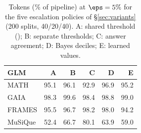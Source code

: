 \begin{table}[h]
\centering
\small
\begin{tabular}{@{}lrrrrr@{}}
\toprule
GLM & A & B & C & D & E \\
\midrule
MATH & 95.1 & 96.1 & 92.9 & 96.9 & 95.2 \\
GAIA & 98.3 & 99.6 & 98.4 & 98.8 & 99.0 \\
FRAMES & 95.5 & 96.7 & 98.2 & 98.0 & 94.2 \\
MuSiQue & 52.4 & 66.7 & 80.1 & 63.9 & 59.0 \\
\bottomrule
\end{tabular}
\caption{Tokens (\% of pipeline) at $\eps = 5\%$ for the five escalation policies of \S\ref{sec:variants} (200 splits,
40/20/40). A: shared threshold (\climb{}); B: separate thresholds; C: answer agreement; D: Bayes deciles; E: learned values.}
\label{tab:policies}
\end{table}
